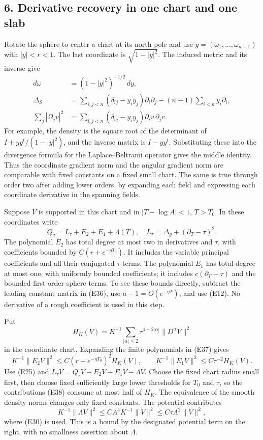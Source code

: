 \documentclass[
  11pt,
]{article}
\begin{document}
\subsection{6. Derivative recovery in one chart and one
slab}\label{derivative-recovery-in-one-chart-and-one-slab}

Rotate the sphere to center a chart at its north pole and use
\(y=(\omega_1,\ldots,\omega_{n-1})\) with \(|y|<r<1\). The last
coordinate is \(\sqrt{1-|y|^2}\). The induced metric and its inverse
give \[
\begin{split}
 d\omega&=(1-|y|^2)^{-1/2}\,dy,\\
 \Delta_S&=\sum_{i,j<n}(\delta_{ij}-y_iy_j)\partial_i\partial_j
                         -(n-1)\sum_{i<n}y_i\partial_i,\\
 \sum_j|\Omega_jv|^2
   &=\sum_{i,j<n}(\delta_{ij}-y_iy_j)
                         \partial_iv\,\overline{\partial_jv}.
\end{split}                                                       \tag{E36}
\] For example, the density is the square root of the determinant of
\(I+yy^t/(1-|y|^2)\), and the inverse matrix is \(I-yy^t\). Substituting
these into the divergence formula for the Laplace--Beltrami operator
gives the middle identity. Thus the coordinate gradient norm and the
angular gradient norm are comparable with fixed constants on a fixed
small chart. The same is true through order two after adding lower
orders, by expanding each field and expressing each coordinate
derivative in the spanning fields.

Suppose \(V\) is supported in this chart and in \(|T-\log A|<1\),
\(T>T_0\). In these coordinates write \[
 Q_\tau=L_\tau+E_2+E_1+\Lambda(T),
 \quad L_\tau=\Delta_y+(\partial_T-\tau)^2.                       \tag{E37}
\] The polynomial \(E_2\) has total degree at most two in derivatives
and \(\tau\), with coefficients bounded by \(C(r+e^{-\eta T_0})\). It
includes the variable principal coefficients and all their conjugated
\(\tau\)-terms. The polynomial \(E_1\) has total degree at most one,
with uniformly bounded coefficients; it includes \(c(\partial_T-\tau)\)
and the bounded first-order sphere terms. To see these bounds directly,
subtract the leading constant matrix in (E36), use
\(a-1=O(e^{-\eta T})\), and use (E12). No derivative of a rough
coefficient is used in this step.

Put \[
 H_K(V)=K^{-1}\sum_{|\alpha|\leq2}
                           \tau^{4-2|\alpha|}\|D^\alpha V\|^2
\] in the coordinate chart. Expanding the finite polynomials in (E37)
gives \[
 K^{-1}\|E_2V\|^2\leq C(r+e^{-\eta T_0})^2H_K(V),\qquad
 K^{-1}\|E_1V\|^2\leq C\tau^{-2}H_K(V).                         \tag{E38}
\] Use (E25) and \(L_\tau V=Q_\tau V-E_2V-E_1V-\Lambda V\). Choose the
fixed chart radius small first, then choose fixed sufficiently large
lower thresholds for \(T_0\) and \(\tau\), so the contributions (E38)
consume at most half of \(H_K\). The equivalence of the smooth density
norms changes only fixed constants. The potential contributes \[
 K^{-1}\|\Lambda V\|^2\leq C A^4K^{-1}\|V\|^2
                                      \leq C\tau A^2\|V\|^2,   \tag{E39}
\] where (E30) is used. This is a bound by the designated potential term
on the right, with no smallness assertion about \(\Lambda\).
\end{document}
